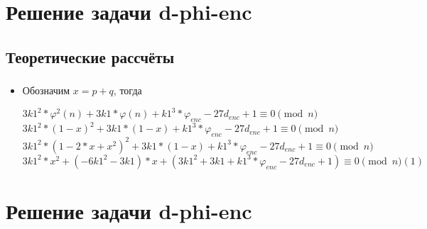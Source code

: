 \documentclass[t]{beamer}
\begin{document}
\section{Решение задачи d-phi-enc}
\subsection{Теоретические рассчёты}
\begin{frame}[t] %
	\frametitle{\insertsection}
	\framesubtitle{\insertsubsection}
        \begin{itemize}
            \item Обозначим $x=p+q$, тогда\newline
            \begin{center}
                \( 3k1^2*\varphi^2(n) + 3k1*\varphi(n) + k1^3*\varphi_{enc} - 27d_{enc} + 1 \equiv 0 \pmod{n} \)\newline
                \( 3k1^2*(1-x)^2 + 3k1*(1-x) + k1^3*\varphi_{enc} - 27d_{enc} + 1 \equiv 0 \pmod{n} \)\newline
                \( 3k1^2*(1-2*x+x^2)^2 + 3k1*(1-x) + k1^3*\varphi_{enc} - 27d_{enc} + 1 \equiv 0 \pmod{n} \)\newline
                \( 3k1^2*x^2 + (-6k1^2-3k1)*x + (3k1^2+3k1+k1^3*\varphi_{enc} - 27d_{enc} + 1) \equiv 0 \pmod{n} (1) \)
            \end{center}
	\end{itemize}
\end{frame}

\section{Решение задачи d-phi-enc}
\end{document}
